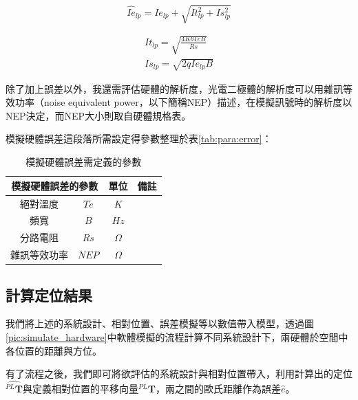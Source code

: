     \begin{equation}
    \label{eqn:noise}
        \hat{Ie}_{lp}=Ie_{lp}+\sqrt{It_{lp}^2+Is_{lp}^2} 
    \end{equation}


    \begin{gather}
        \label{eqn:thermal_noise}
        It_{lp}=\sqrt{\frac{4 Kb Te B}{Rs}}\\
        \label{eqn:shot_noise}
        Is_{lp}=\sqrt{2qIe_{lp}B}
    \end{gather}

    除了加上誤差以外，我還需評估硬體的解析度，光電二極體的解析度可以用雜訊等效功率（noise equivalent power，以下簡稱NEP）描述，在模擬訊號時的解析度以NEP決定，而NEP大小則取自硬體規格表。

    模擬硬體誤差這段落所需設定得參數整理於表\ref{tab:para:error}：

    \begin{table}[h]
        \renewcommand{\arraystretch}{1.3}
        \setlength{\arrayrulewidth}{0.15mm}
        \setlength{\doublerulesep}{0.12mm}
        \caption{模擬硬體誤差需定義的參數}
        \label{tab:para_error}
        \centering
        \begin{tabular}{|cc|c|c|}
        \hline
        \multicolumn{2}{|c|}{\textbf{模擬硬體誤差的參數}}  &\textbf{單位}  &  \textbf{備註}   \\
        \hline
        絕對溫度 &$Te$ & $K$ &  \\
        頻寬 &$B$ & $Hz$ &  \\
        分路電阻 &$Rs$ & $\Omega$ &  \\
        雜訊等效功率 &$NEP$ & $\Omega$ &  \\
        \hline
        \end{tabular}
    \end{table}


    \subsection{計算定位結果}

    我們將上述的系統設計、相對位置、誤差模擬等以數值帶入模型，透過圖\ref{pic:simulate_hardware}中軟體模擬的流程計算不同系統設計下，兩硬體於空間中各位置的距離與方位。

    有了流程之後，我們即可將欲評估的系統設計與相對位置帶入，利用計算出的定位$ \hat{^{PL}\boldsymbol{T} }$與定義相對位置的平移向量$^{PL}\boldsymbol{T}$，兩之間的歐氏距離作為誤差$\hat{e}$。










